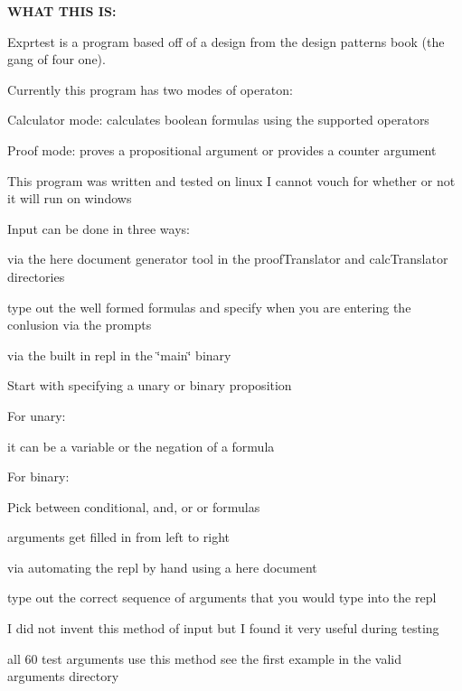 {\bfseries W\+H\+AT T\+H\+IS IS\+:} 
\begin{DoxyItemize}
\item Exprtest is a program based off of a design from the design patterns book (the gang of four one). 
\item Currently this program has two modes of operaton\+: 
\begin{DoxyItemize}
\item Calculator mode\+: calculates boolean formulas using the supported operators 
\item Proof mode\+: proves a propositional argument or provides a counter argument 
\end{DoxyItemize}
\item This program was written and tested on linux I cannot vouch for whether or not it will run on windows 
\item Input can be done in three ways\+: 
\begin{DoxyItemize}
\item via the here document generator tool in the proof\+Translator and calc\+Translator directories 
\begin{DoxyItemize}
\item type out the well formed formulas and specify when you are entering the conlusion via the prompts  
\end{DoxyItemize}
\item via the built in repl in the \char`\"{}main\char`\"{} binary 
\begin{DoxyItemize}
\item Start with specifying a unary or binary proposition 
\begin{DoxyItemize}
\item For unary\+: 
\begin{DoxyItemize}
\item it can be a variable or the negation of a formula 
\end{DoxyItemize}
\end{DoxyItemize}
\begin{DoxyItemize}
\item For binary\+: 
\begin{DoxyItemize}
\item Pick between conditional, and, or or formulas 
\item arguments get filled in from left to right 
\end{DoxyItemize}
\end{DoxyItemize}
\end{DoxyItemize}
\item via automating the repl by hand using a here document 
\begin{DoxyItemize}
\item type out the correct sequence of arguments that you would type into the repl 
\item I did not invent this method of input but I found it very useful during testing 
\item all 60 test arguments use this method see the first example in the valid arguments directory 
\end{DoxyItemize}
\end{DoxyItemize}
\end{DoxyItemize}

